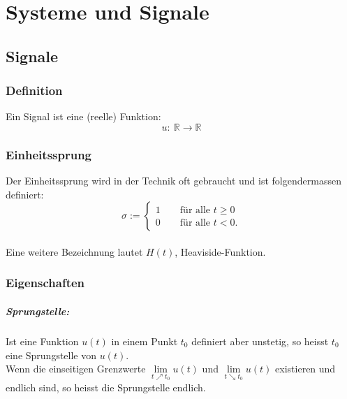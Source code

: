 



\chapter{Systeme und Signale}
\section{Signale}
\subsection{Definition}
Ein Signal ist eine (reelle) Funktion:
\[
	u:\ \mathbb{R} \rightarrow \mathbb{R}
\]


\subsection{Einheitssprung}
Der Einheitssprung wird in der Technik oft gebraucht und ist folgendermassen definiert:
\[
	\sigma := \left\lbrace 
		\begin{matrix}
			1 \qquad \text{für alle } t \ge 0\\
			0 \qquad \text{für alle } t < 0.
		\end{matrix} \right.
\]
\\
Eine weitere Bezeichnung lautet $H(t)$, Heaviside-Funktion.


\subsection{Eigenschaften}
\paragraph{Sprungstelle:}
Ist eine Funktion $u(t)$ in einem Punkt $t_0$ definiert aber unstetig, so heisst $t_0$ eine Sprungstelle von $u(t)$.\\
Wenn die einseitigen Grenzwerte $\lim\limits_{t \nearrow t_0} u(t)$ und $\lim\limits_{t \searrow t_0} u(t)$ existieren und endlich sind, so heisst die Sprungstelle endlich.
